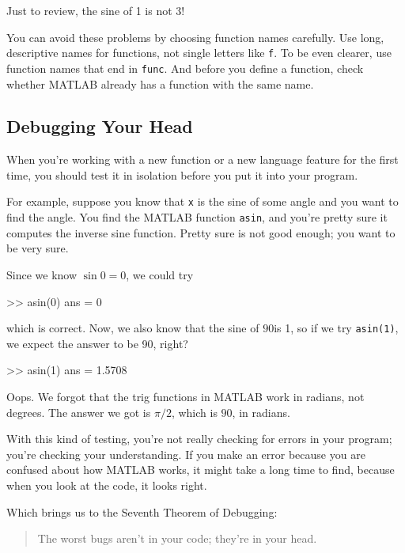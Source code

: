 Just to review, the sine of 1 is not 3!

You can avoid these problems by choosing function names carefully. Use long, descriptive names for functions, not single letters like \lstinline{f}. To be even clearer, use function names that end in \lstinline{func}. And before you define a function, check whether MATLAB already has a function with the same name.

\subsection{Debugging Your Head}

When you're working with a new function or a new language feature
for the first time, you should test it in isolation before you
put it into your program.


For example, suppose you know that \lstinline{x} is the sine of some
angle and you want to find the angle.  You find the MATLAB function
\lstinline{asin}, and you're pretty sure it computes the inverse sine
function.  Pretty sure is not good enough; you want to be very sure.

Since we know $\sin 0 = 0$, we could try

\begin{code}
>> asin(0)
ans = 0
\end{code}
which is correct.  Now, we also know that the sine of $90$\textdegree is
1, so if we try \lstinline{asin(1)}, we expect the answer to be 90, right?

\begin{code}
>> asin(1)
ans = 1.5708
\end{code}

Oops.  We forgot that the trig functions in MATLAB work in radians,
not degrees.  The answer we got is $\pi/2$, which is $90$\textdegree, in radians.

With this kind of testing, you're not really checking for
errors in your program; you're checking your understanding.  If you
make an error because you are confused about how MATLAB works, it
might take a long time to find, because when you look at the code,
it looks right.


Which brings us to the Seventh Theorem of Debugging:

\begin{quote}
The worst bugs aren't in your code; they're in your head.
\end{quote}

